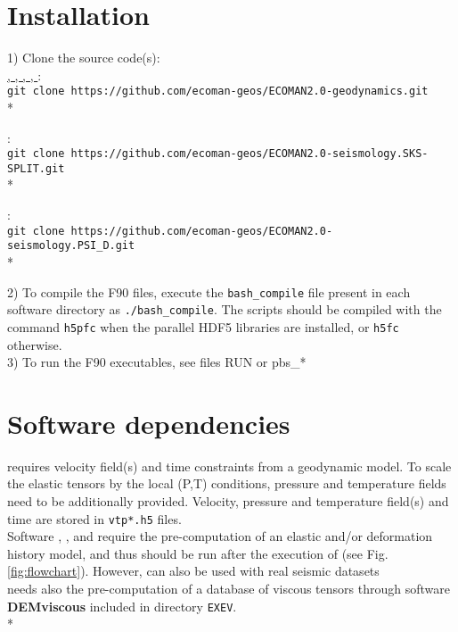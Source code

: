\section{Installation}

1) Clone the source code(s): \\

\href{https://github.com/ecoman-geos/ECOMAN2.0-geodynamics.git}{\drexstitle{}, \drexmtitle{}, \exevtitle{}, \viztomotitle{}, \vizvisctitle}: \\
\texttt{git clone https://github.com/ecoman-geos/ECOMAN2.0-geodynamics.git}\\*

\href{https://github.com/ecoman-geos/ECOMAN2.0-seismology.SKS-SPLIT.git}{\skstitle{}}: \\
\texttt{git clone https://github.com/ecoman-geos/ECOMAN2.0-seismology.SKS-SPLIT.git}\\*

\href{https://github.com/ecoman-geos/ECOMAN2.0-seismology.PSI_D}{\psitomotitle{}}: \\
\texttt{git clone https://github.com/ecoman-geos/ECOMAN2.0-seismology.PSI\_D.git}\\*

2) To compile the F90 files, execute the \texttt{bash\_compile} file present in each software directory as \texttt{./bash\_compile}. The scripts should be compiled with the command \texttt{h5pfc} when the parallel HDF5 libraries are installed, or \texttt{h5fc} otherwise.\\

3) To run the F90 executables, see files RUN or pbs\_*

\section{Software dependencies}
\drexmtitle{} requires velocity field(s) and time constraints from a geodynamic model. To scale the elastic tensors by the local (P,T) conditions, pressure and temperature fields need to be additionally provided. Velocity, pressure and temperature field(s) and time are stored in \texttt{vtp*.h5} files.  \\
Software \viztomotitle{}, \vizvisctitle, \skstitle{} and \psitomotitle{} require the pre-computation of an elastic and/or deformation history model, and thus should be run after the execution of \drexmtitle{} (see Fig. \ref{fig:flowchart}). However, \psitomotitle{} can also be used with real seismic datasets\\
\vizvisctitle{} needs also the pre-computation of a database of viscous tensors through software \textbf{DEMviscous} included in directory \texttt{EXEV}.\\*

